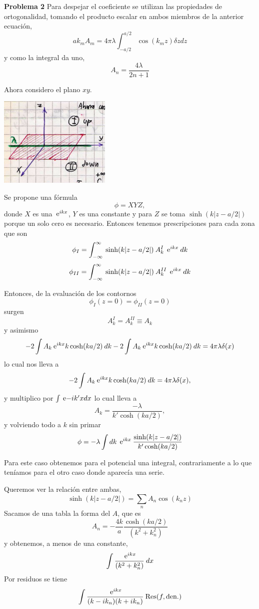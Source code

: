 \documentclass[10pt,oneside]{CBFT_book}
\begin{document}
\begin{ejemplo}{\bf Problema 2}
Para despejar el coeficiente se utilizan las propiedades de ortogonalidad,
tomando el producto escalar en ambos miembros de la anterior ecuación,
\[
	a k_m A_m = 4 \pi \lambda \int_{-a/2}^{a/2} \cos( k_m z ) \delta{z} dz
\]
y como la integral da uno,
\[
	A_n = \frac{ 4 \lambda }{ 2 n + 1 }
\]

Ahora considero el plano $xy$.

\includegraphics[width=0.4\textwidth]{images/fig_ft1_problema2_sep_C.jpg}

Se propone una fórmula 
\[
	\phi = X Y Z,
\]
donde $X$ es una $\:\mathrm{e}^{ikx}$, $Y$ es una constante y para $Z$
se toma $ \sinh( k |z - a/2| ) $ porque un solo cero es necesario.
Entonces tenemos prescripciones para cada zona que son 
\[
	\phi_I = \int_{-\infty}^{\infty} \: 
	\sinh( k|z-a/2| ) \: A_k^I \: \:\mathrm{e}^{ikx} \: dk
\]
\[
	\phi_{II} = \int_{-\infty}^{\infty} \: 
	\sinh( k|z-a/2| ) \: A_k^{II} \: \:\mathrm{e}^{ikx} \: dk
\]

Entonces, de la evaluación de los contornos 
\[
	\phi_I(z=0) = \phi_{II}(z=0)
\]
surgen
\[
	A_k^{I} = A_k^{II} \equiv A_k
\]
y asimismo
\[
	- 2 \int A_k \:\mathrm{e}^{ikx} k \cosh( ka/2 ) \: dk 
	- 2 \int A_k \:\mathrm{e}^{ikx} k \cosh( ka/2 ) \: dk = 4 \pi \lambda \delta(x)
\]
lo cual nos lleva a
\[
	- 2 \int A_k \:\mathrm{e}^{ikx} k \cosh( ka/2 ) \: dk
	= 4 \pi \lambda \delta(x),
\]
y multiplico por $\int \:\mathrm{e}{-ik'x} dx$
lo cual lleva a 
\[
	A_k = \frac{-\lambda}{k'\cosh(ka/2)},
\]
y volviendo todo a $k$ sin primar
\[
	\phi = -\lambda \int dk \: \:\mathrm{e}^{ikx} \:
	\frac{\sinh( k|z-a/2|)}{k'\cosh(ka/2)}
\]

Para este caso obtenemos para el potencial una integral, contrariamente
a lo que teníamos para el otro caso donde aparecía una serie.

Queremos ver la relación entre ambas,
\[
	\sinh( k |z-a/2 |) = \sum_{n} A_n \cos(k_n z)
\]
Sacamos de una tabla la forma del $A$, que es
\[
	A_n = - \frac{4k}{a} \frac{\cosh( ka/2 )}{ ( k^2 + k_n^2 ) }
\]
y obtenemos, a menos de una constante,
\[
	\int \frac{ \:\mathrm{e}^{ i k x } }{ ( k^2 + k_n^2 ) } \: dx
\]
Por residuos se tiene 
\[
	\int \frac{ \:\mathrm{e}^{ i k x } }{ ( k - i k_n )( k + i k_n ) } \: \mathrm{Res}(f, \text{den.})
\]


\end{ejemplo}
\end{document}
